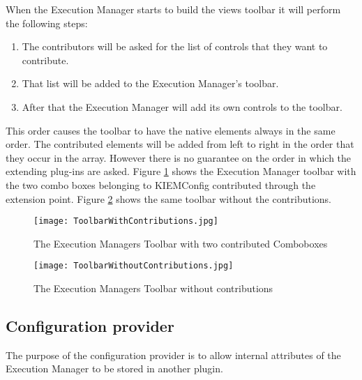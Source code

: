 When the Execution Manager starts to build the views toolbar it will perform the following steps:
\begin{enumerate}
 \item The contributors will be asked for the list of controls that they want to contribute.
 \item That list will be added to the Execution Manager's toolbar.
 \item After that the Execution Manager will add its own controls to the toolbar.
\end{enumerate}
This order causes the toolbar to have the native elements always in the same order.
The contributed elements will be added from left to right in the order that they occur in the array. However there
is no guarantee on the order in which the extending plug-ins are asked.
Figure \ref{fig:ToolbarWithContributions} shows the Execution Manager toolbar with the two combo boxes belonging to \ac{KIEMConfig}
contributed through the extension point. Figure \ref{fig:ToolbarWithoutContributions} shows the same toolbar without
the contributions.
\begin{figure}[ToolbarWithContributions]
  \centering
  \texttt{[image: ToolbarWithContributions.jpg]}
  \caption[The Execution Managers Toolbar with two contributed Comboboxes]%
  {The Execution Managers Toolbar with two contributed Comboboxes\protect\footnotemark}
  \label{fig:ToolbarWithContributions}
\end{figure}
\begin{figure}[ToolbarWithoutContributions]
  \centering
  \texttt{[image: ToolbarWithoutContributions.jpg]}
  \caption[The Execution Managers Toolbar without contributions]%
  {The Execution Managers Toolbar without contributions\protect\footnotemark}
  \label{fig:ToolbarWithoutContributions}
\end{figure}


\subsection{Configuration provider}
\label{section:ConfigurationProvider}
The purpose of the configuration provider is to allow internal attributes of the
Execution Manager to be stored in another plugin. 

